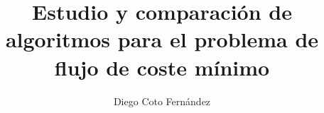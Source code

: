 \documentclass[12pt,titlepage]{article}
\title{Estudio y comparación de algoritmos para el problema de flujo de coste mínimo}
\author{Diego Coto Fernández}
\date{}
\numberwithin{equation}{subsection}
\begin{document}
\onehalfspacing



\newpage



\newpage



\newpage



\newpage


\end{document}
